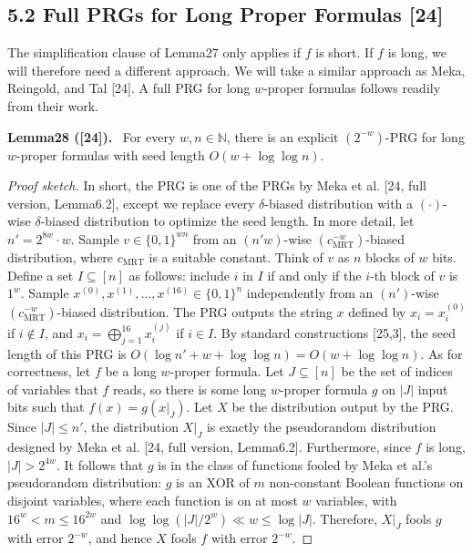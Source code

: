 \documentclass[10pt,a4paper]{article}
\newenvironment{authorclaim}[1]{\par\medskip\noindent\textbf{#1.}\ \ignorespaces}{\par\medskip}
\begin{document}
\subsection*{5.2 Full PRGs for Long Proper Formulas [24]}
The simplification clause of Lemma27 only applies if $f$ is short. If $f$ is long, we will therefore need a different approach. We will take a similar approach as Meka, Reingold, and Tal [24]. A full PRG for long $w$-proper formulas follows readily from their work.
\begin{authorclaim}{Lemma28 ([24])}
For every $w,n\in\mathbb N$, there is an explicit $(2^{-w})$-PRG for long $w$-proper formulas with seed length $O(w+\log\log n)$.
\end{authorclaim}
\begin{proof}[Proof sketch]
In short, the PRG is one of the PRGs by Meka et al. [24, full version, Lemma6.2], except we replace every $\delta$-biased distribution with a $(\cdot)$-wise $\delta$-biased distribution to optimize the seed length.
In more detail, let $n'=2^{8w}\cdot w$. Sample $v\in\{0,1\}^{wn}$ from an $(n'w)$-wise $(c_{\mathrm{MRT}}^{-w})$-biased distribution, where $c_{\mathrm{MRT}}$ is a suitable constant. Think of $v$ as $n$ blocks of $w$ bits. Define a set $I\subseteq[n]$ as follows: include $i$ in $I$ if and only if the $i$-th block of $v$ is $1^w$.
Sample $x^{(0)},x^{(1)},\ldots,x^{(16)}\in\{0,1\}^n$ independently from an $(n')$-wise $(c_{\mathrm{MRT}}^{-w})$-biased distribution. The PRG outputs the string $x$ defined by $x_i=x_i^{(0)}$ if $i\notin I$, and $x_i=\bigoplus_{j=1}^{16}x_i^{(j)}$ if $i\in I$.
By standard constructions [25,3], the seed length of this PRG is $O(\log n'+w+\log\log n)=O(w+\log\log n)$.
As for correctness, let $f$ be a long $w$-proper formula. Let $J\subseteq[n]$ be the set of indices of variables that $f$ reads, so there is some long $w$-proper formula $g$ on $|J|$ input bits such that $f(x)=g(x|_J)$. Let $X$ be the distribution output by the PRG. Since $|J|\le n'$, the distribution $X|_J$ is exactly the pseudorandom distribution designed by Meka et al. [24, full version, Lemma6.2]. Furthermore, since $f$ is long, $|J|>2^{4w}$. It follows that $g$ is in the class of functions fooled by Meka et al.'s pseudorandom distribution: $g$ is an XOR of $m$ non-constant Boolean functions on disjoint variables, where each function is on at most $w$ variables, with $16^w<m\le16^{2w}$ and $\log\log(|J|/2^w)\ll w\le\log|J|$. Therefore, $X|_J$ fools $g$ with error $2^{-w}$, and hence $X$ fools $f$ with error $2^{-w}$.
\end{proof}
\end{document}
